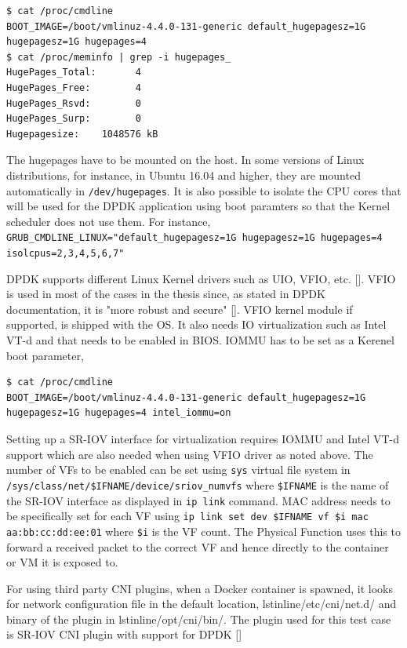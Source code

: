 \documentclass[english, 12pt, a4paper, elec, utf8, a-1b, online]{aaltothesis}
\begin{document}
\begin{lstlisting}[basicstyle={\small\ttfamily}]
$ cat /proc/cmdline 
BOOT_IMAGE=/boot/vmlinuz-4.4.0-131-generic default_hugepagesz=1G hugepagesz=1G hugepages=4
$ cat /proc/meminfo | grep -i hugepages_
HugePages_Total:       4
HugePages_Free:        4
HugePages_Rsvd:        0
HugePages_Surp:        0
Hugepagesize:    1048576 kB
\end{lstlisting}

The hugepages have to be mounted on the host. In some versions of Linux distributions, for instance, in Ubuntu 16.04 and higher, they are mounted automatically in \lstinline{/dev/hugepages}. It is also possible to isolate the CPU cores that will be used for the DPDK application using boot paramters so that the Kernel scheduler does not use them. For instance, \lstinline{GRUB_CMDLINE_LINUX="default_hugepagesz=1G hugepagesz=1G hugepages=4 isolcpus=2,3,4,5,6,7"}

DPDK supports different Linux Kernel drivers such as UIO, VFIO, etc. []. VFIO is used in most of the cases in the thesis since, as stated in DPDK documentation, it is "more robust and secure" []. VFIO kernel module if supported, is shipped with the OS. It also needs IO virtualization such as Intel VT-d and that needs to be enabled in BIOS. IOMMU has to be set as a Kerenel boot parameter,
\begin{lstlisting}[basicstyle={\small\ttfamily}]
$ cat /proc/cmdline 
BOOT_IMAGE=/boot/vmlinuz-4.4.0-131-generic default_hugepagesz=1G hugepagesz=1G hugepages=4 intel_iommu=on
\end{lstlisting}

Setting up a SR-IOV interface for virtualization requires IOMMU and Intel VT-d support which are also needed when using VFIO driver as noted above. The number of VFs to be enabled can be set using \lstinline{sys} virtual file system in 
\lstinline{/sys/class/net/$IFNAME/device/sriov_numvfs} where \lstinline{$IFNAME} is the name of the SR-IOV interface as displayed in \lstinline{ip link} command. MAC address needs to be specifically set for each VF using \lstinline{ip link set dev $IFNAME vf $i mac aa:bb:cc:dd:ee:01} where \lstinline{$i} is the VF count. The Physical Function uses this to forward a received packet to the correct VF and hence directly to the container or VM it is exposed to.

For using third party CNI plugins, when a Docker container is spawned, it looks for network configuration file in the default location, lstinline{/etc/cni/net.d/} and binary of the plugin in lstinline{/opt/cni/bin/}. The plugin used for this test case is SR-IOV CNI plugin with support for DPDK []
\end{document}
